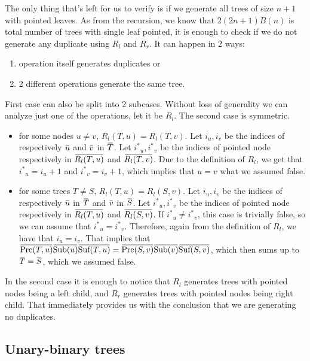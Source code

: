 \documentclass[final]{article}
\theoremstyle{definition}
\theoremstyle{remark}
\newcommand{\ols}[1]{\mskip.5\thinmuskip\overline{\mskip-.5\thinmuskip {#1} \mskip-.5\thinmuskip}\mskip.5\thinmuskip} %
\newcommand{\enc}[1]{\ensuremath{\ols{#1}}}
\newcommand{\pointed}[1]{\ensuremath{{#1}^*}}
\DeclareMathOperator{\tSub}{\text{Sub}}
\DeclareMathOperator{\tPre}{\text{Pre}}
\DeclareMathOperator{\tSuf}{\text{Suf}}
\begin{document}
The only thing that's left for us to verify is if we generate all trees of size \(n + 1\) with pointed leaves. As from the recursion, we know that \(2 (2n + 1) B(n)\) is total number of trees with single leaf pointed, it is enough to check if we do not generate any duplicate using \(R_l\) and \(R_r\). It can happen in 2 ways:
\begin{enumerate}
    \item operation itself generates duplicates or
    \item 2 different operations generate the same tree.
\end{enumerate}

First case can also be split into 2 subcases. Without loss of generality we can analyze just one of the operations, let it be \(R_l\). The second case is symmetric.
\begin{itemize}
    \item for some nodes \(u \neq v\), \(R_l(T, u) = R_l(T, v)\). Let \(i_u, i_v\) be the indices of respectively \(\enc{u}\) and \(\enc{v}\) in \(\enc{T}\). Let \(\pointed{i}_u, \pointed{i}_v\) be the indices of pointed node respectively in \(\enc{R_l(T, u)}\) and \(\enc{R_l(T, v)}\). Due to the definition of \(R_l\), we get that \(\pointed{i}_u = i_u + 1\) and \(\pointed{i}_v = i_v + 1\), which implies that \(u = v\) what we assumed false.
    \item for some trees \(T \neq S\), \(R_l(T, u) = R_l(S, v)\). Let \(i_u, i_v\) be the indices of respectively \(\enc{u}\) in \(\enc{T}\) and \(\enc{v}\) in \(\enc{S}\). Let \(\pointed{i}_u, \pointed{i}_v\) be the indices of pointed node respectively in \(\enc{R_l(T, u)}\) and \(\enc{R_l(S, v)}\). If \(\pointed{i}_u \neq \pointed{i}_v\), this case is trivially false, so we can assume that \(\pointed{i}_u = \pointed{i}_v\). Therefore, again from the definition of \(R_l\), we have that \(i_u = i_v\). That implies that \(\enc{\tPre(T, u)} \enc{\tSub(u)} \enc{\tSuf(T, u)} = \enc{\tPre(S, v)} \enc{\tSub(v)} \enc{\tSuf(S, v)} \), which then sums up to \(\enc{T} = \enc{S}\), which we assumed false.
\end{itemize}

In the second case it is enough to notice that \(R_l\) generates trees with pointed nodes being a left child, and \(R_r\) generates trees with pointed nodes being right child. That immediately provides us with the conclusion that we are generating no duplicates.

\subsection{Unary-binary trees}%
\label{sub:unary_binary_trees}
\end{document}
